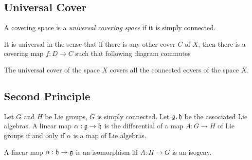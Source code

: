 \subsection{Universal Cover}
\label{sub:universal_cover}


A covering space is a \emph{universal covering space} if it is simply connected. 

It is universal in the sense that if there is any other cover $C$ of $X$, then there is a covering map $f: D\to C$ such that following diagram commutes
\begin{center}
\end{center}

\begin{insight}
   The universal cover of the space $X$ covers all the connected covers of the space $X$.
\end{insight}

\subsection{Second Principle}
\label{sub:second_principle}

Let $G$ and $H$ be Lie groups, $G$ is simply connected. Let $\mathfrak{g}, \mathfrak{h}$ be the associated Lie algebras. A linear map $\alpha: \mathfrak{g} \to \mathfrak{h}$ is the differential of a map $A: G\to H$ of Lie groups if and only if $\alpha$ is a map of Lie algebras.

\begin{proposition}
   A linear map $\alpha: \mathfrak{h} \to \mathfrak{g}$  is an isomorphism iff $A: H\to G$ is an isogeny.
\end{proposition}

